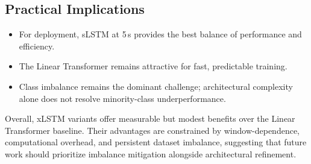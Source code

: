\subsection{Practical Implications}

\begin{itemize}
\item For deployment, \ac{sLSTM} at 5\,s provides the best balance of performance
and efficiency.
\item The Linear Transformer remains attractive for fast, predictable training.
\item Class imbalance remains the dominant challenge; architectural complexity
alone does not resolve minority-class underperformance.
\end{itemize}

Overall, \ac{xLSTM} variants offer measurable but modest benefits over the
Linear Transformer baseline. Their advantages are constrained by
window-dependence, computational overhead, and persistent dataset imbalance,
suggesting that future work should prioritize imbalance mitigation alongside
architectural refinement.
